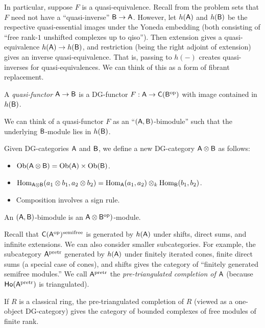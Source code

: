 \documentclass{amsart}
\begin{document}
In particular, suppose $F$ is a quasi-equivalence.
Recall from the problem sets that $F$ need not have a ``quasi-inverse'' $\mathsf{B} \to \mathsf{A}$.
However, let $h(\mathsf{A})$ and $h(\mathsf{B})$ be the respective quasi-essential images under the Yoneda embedding (both consisting of ``free rank-$1$ unshifted complexes up to qiso'').
Then extension gives a quasi-equivalence $h(\mathsf{A}) \to h(\mathsf{B})$, and restriction (being the right adjoint of extension) gives an inverse quasi-equivalence.
That is, passing to $h(-)$ creates quasi-inverses for quasi-equivalences.
We can think of this as a form of fibrant replacement.

\begin{dfn}
	A \emph{quasi-functor} $\mathsf{A} \to \mathsf{B}$ is a DG-functor $F: \mathsf{A} \to \mathsf{C}(\mathsf{B}^{\mathrm{op}})$ with image contained in $h(\mathsf{B})$.
\end{dfn}

We can think of a quasi-functor $F$ as an ``$(\mathsf{A}, \mathsf{B})$-bimodule'' such that the underlying $\mathsf{B}$-module lies in $h(\mathsf{B})$.

\begin{rmk}
	Given DG-categories $\mathsf{A}$ and $\mathsf{B}$, we define a new DG-category $\mathsf{A} \otimes \mathsf{B}$ as follows:
	\begin{itemize}
		\item $\operatorname{Ob} (\mathsf{A} \otimes \mathsf{B}) = \operatorname{Ob} (\mathsf{A}) \times \operatorname{Ob} (\mathsf{B})$.
		\item $\operatorname{Hom}_{\mathsf{A} \otimes \mathsf{B}}(a_1 \otimes b_1, a_2 \otimes b_2) = \operatorname{Hom}_{\mathsf{A}}(a_1, a_2) \otimes_k \operatorname{Hom}_{\mathsf{B}}(b_1, b_2)$.
		\item Composition involves a sign rule.
	\end{itemize}
	An $(\mathsf{A}, \mathsf{B})$-bimodule is an $\mathsf{A} \otimes \mathsf{B}^{\mathrm{op}})$-module.
\end{rmk}

Recall that $\mathsf{C}(\mathsf{A}^{\mathrm{op}})^{\mathrm{semifree}}$ is generated by $h(\mathsf{A})$ under shifts, direct sums, and infinite extensions.
We can also consider smaller subcategories.
For example, the subcategory $\mathsf{A}^{\mathrm{pretr}}$ generated by $h(\mathsf{A})$ under finitely iterated cones, finite direct sums (a special case of cones), and shifts gives the category of ``finitely generated semifree modules.''
We call $\mathsf{A}^{\mathrm{pretr}}$ the \emph{pre-triangulated completion of $\mathsf{A}$} (because $\mathsf{Ho}(\mathsf{A}^{\mathrm{pretr}})$ is triangulated).

\begin{ex}
	If $R$ is a classical ring, the pre-triangulated completion of $R$ (viewed as a one-object DG-category) gives the category of bounded complexes of free modules of finite rank.
\end{ex}
\end{document}
